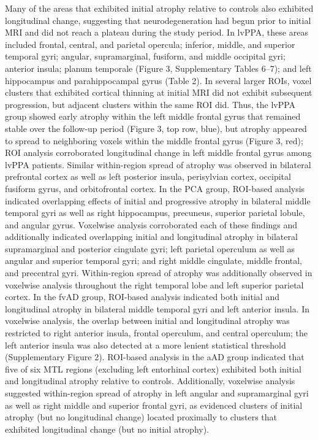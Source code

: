 \documentclass[]{article}
\begin{document}
Many of the areas that exhibited initial atrophy relative to controls
also exhibited longitudinal change, suggesting that neurodegeneration
had begun prior to initial MRI and did not reach a plateau during the
study period. In lvPPA, these areas included frontal, central, and
parietal opercula; inferior, middle, and superior temporal gyri;
angular, supramarginal, fusiform, and middle occipital gyri; anterior
insula; planum temporale (Figure 3, Supplementary Tables 6--7); and left
hippocampus and parahippocampal gyrus (Table 2). In several larger ROIs,
voxel clusters that exhibited cortical thinning at initial MRI did not
exhibit subsequent progression, but adjacent clusters within the same
ROI did. Thus, the lvPPA group showed early atrophy within the left
middle frontal gyrus that remained stable over the follow-up period
(Figure 3, top row, blue), but atrophy appeared to spread to neighboring
voxels within the middle frontal gyrus (Figure 3, red); ROI analysis
corroborated longitudinal change in left middle frontal gyrus among
lvPPA patients. Similar within-region spread of atrophy was observed in
bilateral prefrontal cortex as well as left posterior insula,
perisylvian cortex, occipital fusiform gyrus, and orbitofrontal cortex.
In the PCA group, ROI-based analysis indicated overlapping effects of
initial and progressive atrophy in bilateral middle temporal gyri as
well as right hippocampus, precuneus, superior parietal lobule, and
angular gyrus. Voxelwise analysis corroborated each of these findings
and additionally indicated overlapping initial and longitudinal atrophy
in bilateral supramarginal and posterior cingulate gyri; left parietal
operculum as well as angular and superior temporal gyri; and right
middle cingulate, middle frontal, and precentral gyri. Within-region
spread of atrophy was additionally observed in voxelwise analysis
throughout the right temporal lobe and left superior parietal cortex. In
the fvAD group, ROI-based analysis indicated both initial and
longitudinal atrophy in bilateral middle temporal gyri and left anterior
insula. In voxelwise analysis, the overlap between initial and
longitudinal atrophy was restricted to right anterior insula, frontal
operculum, and central operculum; the left anterior insula was also
detected at a more lenient statistical threshold (Supplementary Figure
2). ROI-based analysis in the aAD group indicated that five of six MTL
regions (excluding left entorhinal cortex) exhibited both initial and
longitudinal atrophy relative to controls. Additionally, voxelwise
analysis suggested within-region spread of atrophy in left angular and
supramarginal gyri as well as right middle and superior frontal gyri, as
evidenced clusters of initial atrophy (but no longitudinal change)
located proximally to clusters that exhibited longitudinal change (but
no initial atrophy).
\end{document}
